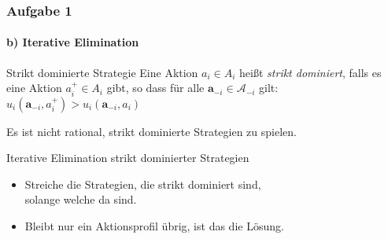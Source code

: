 \documentclass{beamer}
\begin{document}
\begin{frame}
	\frametitle{Aufgabe 1}
	\framesubtitle{b) Iterative Elimination}


	\begin{block}{Strikt dominierte Strategie}
		Eine Aktion $a_i \in A_i$ heißt \textit{strikt dominiert}, falls es eine Aktion $a^+_i \in A_i$ gibt, so dass für
		alle $\mathbf{a}_{-i} \in \mathcal{A}_{-i}$ gilt:\\
		\centering
		$u_i(\mathbf{a}_{-i}, a^+_i) > u_i(\mathbf{a}_{-i}, a_i)$
	\end{block}
	Es ist nicht rational, strikt dominierte Strategien zu spielen.


	\begin{block}{Iterative Elimination strikt dominierter Strategien}
		\begin{itemize}
			\item Streiche die Strategien, die strikt dominiert sind,\\ solange welche da sind.
			\item Bleibt nur ein Aktionsprofil übrig, ist das die Lösung.
		\end{itemize}
	\end{block}

\end{frame}
\end{document}
